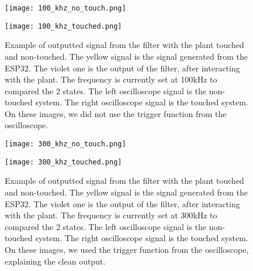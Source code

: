 \begin{figure}[h!]
    \centering
    \begin{minipage}{.5\textwidth}
        \centering
        \texttt{[image: 100\_khz\_no\_touch.png]}
        \label{fig:100_khz_no_touch}
    \end{minipage}%
    \begin{minipage}{.5\textwidth}
        \centering
        \texttt{[image: 100\_khz\_touched.png]}
        \label{fig:100_khz_touched}
    \end{minipage}
    \caption{Example of outputted signal from the filter with the plant touched and non-touched. The yellow signal is the signal generated from the ESP32. The violet one is the output of the filter, after interacting with the plant. The frequency is currently set at 100kHz to compared the 2 states. The left oscilloscope signal is the non-touched system. The right oscilloscope signal is the touched system. On these images, we did not use the trigger function from the oscilloscope.}
    \label{fig:100_khz_signals}
\end{figure}


\begin{figure}[h!]
    \centering
    \begin{minipage}{.5\textwidth}
        \centering
        \texttt{[image: 300\_khz\_no\_touch.png]}
        \label{fig:300_khz_no_touch}
    \end{minipage}%
    \begin{minipage}{.5\textwidth}
        \centering
        \texttt{[image: 300\_khz\_touched.png]}
        \label{fig:300_khz_touched}
    \end{minipage}
    \caption{Example of outputted signal from the filter with the plant touched and non-touched. The yellow signal is the signal generated from the ESP32. The violet one is the output of the filter, after interacting with the plant. The frequency is currently set at 300kHz to compared the 2 states. The left oscilloscope signal is the non-touched system. The right oscilloscope signal is the touched system. On these images, we used the trigger function from the oscilloscope, explaining the clean output.}
    \label{fig:300_khz_signals}
\end{figure}


